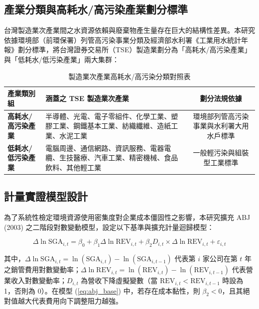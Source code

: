 \documentclass[12pt,a4paper]{article}
\begin{document}
\subsection{產業分類與高耗水/高污染產業劃分標準}

台灣製造業次產業間之水資源依賴與廢棄物產生量存在巨大的結構性差異。本研究依據環境部（前環保署）列管高污染事業分類及經濟部水利署《工業用水統計年報》劃分標準，將台灣證券交易所（TSE）製造業劃分為「高耗水/高污染產業」與「低耗水/低污染產業」兩大集群：

\begin{table}[H]
\centering
\caption{製造業次產業高耗水/高污染分類對照表}
\label{tab:industry_class}
\small
\begin{tabular}{lp{7.5cm}c}
\toprule
產業類別組 & 涵蓋之 TSE 製造業次產業 & 劃分法規依據 \\
\midrule
\textbf{高耗水/高污染產業} & 半導體、光電、電子零組件、化學工業、塑膠工業、鋼鐵基本工業、紡織纖維、造紙工業、水泥工業 & 環境部列管高污染事業與水利署大用水戶標準 \\
\textbf{低耗水/低污染產業} & 電腦周邊、通信網路、資訊服務、電器電纜、生技醫療、汽車工業、精密機械、食品飲料、其他輕工業 & 一般輕污染與組裝型工業標準 \\
\bottomrule
\end{tabular}
\end{table}

\subsection{計量實證模型設計}

為了系統性檢定環境資源使用密集度對企業成本僵固性之影響，本研究擴充 ABJ (2003) 之二階段對數變動模型，設定以下基準與擴充計量迴歸模型：

\begin{equation}
\label{eq:abj_base}
\Delta\ln\text{SGA}_{i,t} = \beta_0 + \beta_1 \Delta\ln\text{REV}_{i,t} + \beta_2 D_{i,t} \times \Delta\ln\text{REV}_{i,t} + \varepsilon_{i,t}
\end{equation}

其中，$\Delta\ln\text{SGA}_{i,t} = \ln(\text{SGA}_{i,t}) - \ln(\text{SGA}_{i,t-1})$ 代表第 $i$ 家公司在第 $t$ 年之銷管費用對數變動率；$\Delta\ln\text{REV}_{i,t} = \ln(\text{REV}_{i,t}) - \ln(\text{REV}_{i,t-1})$ 代表營業收入對數變動率；$D_{i,t}$ 為營收下降虛擬變數（當 $\text{REV}_{i,t} < \text{REV}_{i,t-1}$ 時設為 1，否則為 0）。在模型 (\ref{eq:abj_base}) 中，若存在成本黏性，則 $\beta_2 < 0$，且其絕對值越大代表費用向下調整阻力越強。
\end{document}

